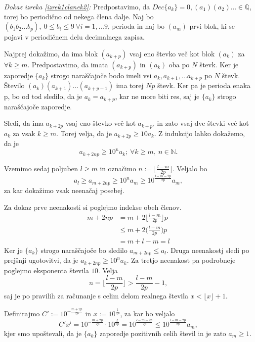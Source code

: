 \documentclass[a4paper,12pt]{article}
\def\N{\mathbb{N}} %
\def\Q{\mathbb{Q}} %
\begin{document}
{\em Dokaz izreka \ref{izrek1clanek2}:\/} Predpostavimo, da $Dec\{a_k\} = 0,(a_1)(a_2)\dots \in \Q$, torej bo 
periodično od nekega člena dalje. Naj bo
$(b_1b_2 \dots b_p), \ 0 \leq b_i \leq 9 \ \forall i = 1, \dots 9$, perioda in naj bo
$(a_m)$ prvi blok, ki se pojavi v periodičnem delu decimalnega zapisa.

Najprej dokažimo, da ima blok $(a_{k+p})$ vsaj eno števko več kot blok $(a_k)$ za $\forall k \geq m$.
Predpostavimo, da imata $(a_{k+p})$ in $(a_k)$ oba po $N$ števk. 
Ker je zaporedje $\{a_k\}$ strogo naraščajoče bodo imeli vsi $a_k, a_{k+1}, \dots a_{k+p}$ po $N$ števk.
Število $(a_k)(a_{k+1})\dots (a_{k+p-1})$ ima torej $Np$ števk. Ker pa je perioda enaka p,
bo od tod sledilo, da je $a_k = a_{k+p}$, kar ne more biti res, saj je $\{a_k\}$ strogo naraščajoče zaporedje.

Sledi, da ima $a_{k+ 2p}$ vsaj eno števko več kot $a_{k+p}$, in zato vsaj dve števki več kot $a_k$
za vsak $k \geq m$.
Torej velja, da je $a_{k+2p} \geq 10 a_k$. Z indukcijo lahko dokažemo, da je 
\[ a_{k+2np} \geq 10^n a_k; \ \forall k \geq m, \ n \in \N.\]

Vzemimo sedaj poljuben $l \geq m$ in označimo $n := \lfloor \frac{l-m}{2p} \rfloor$.
Veljalo bo 
\begin{equation}\label{enacba1}
    a_l \geq a_{m+2np} \geq 10^n a_m \geq 10 ^{\frac{l-m-2p}{2p}}a_m,
\end{equation}
za kar dokažimo vsak neenačaj posebej.

Za dokaz prve neenakosti si poglejmo indekse obeh členov. 
\[
    \begin{split}
    m + 2np &= m + 2 \bigg\lfloor \frac{l-m}{2p}\bigg\rfloor p \\
    &\leq m + 2\bigg(\frac{l-m}{2p}\bigg)p \\
    &= m + l - m = l
    \end{split}
    \] 
Ker je $\{a_k\}$ strogo naraščajoče bo sledilo $a_{m+2np} \leq a_l$.
Druga neenakostj sledi po prejšnji ugotovitvi, da je $a_{k+2np} \geq 10^n a_k$.
Za tretjo neenakost pa podrobneje poglejmo eksponenta števila $10$. Velja
\[
    n = \bigg\lfloor \frac{l-m}{2p}\bigg\rfloor > \frac{l-m}{2p} - 1,
     \]
saj je po pravilih za računanje s celim delom realnega števila $x < \lfloor x\rfloor + 1$.

Definirajmo $C' := 10^{-\frac{m + 2p}{2p}}$ in $x := 10^{\frac{1}{2p}}$, za kar bo veljalo
\begin{equation}\label{enacba2}
     C'x^l = 10^{-\frac{m + 2p}{2p}} \cdot 10^{\frac{l}{2p}} = 10 ^{\frac{l-m-2p}{2p}}
     \leq 10 ^{\frac{l-m-2p}{2p}} a_m,
\end{equation}
kjer smo upoštevali, da je $\{a_k\}$ zaporedje pozitivnih celih števil in je zato $a_m \geq 1$.
\end{document}
